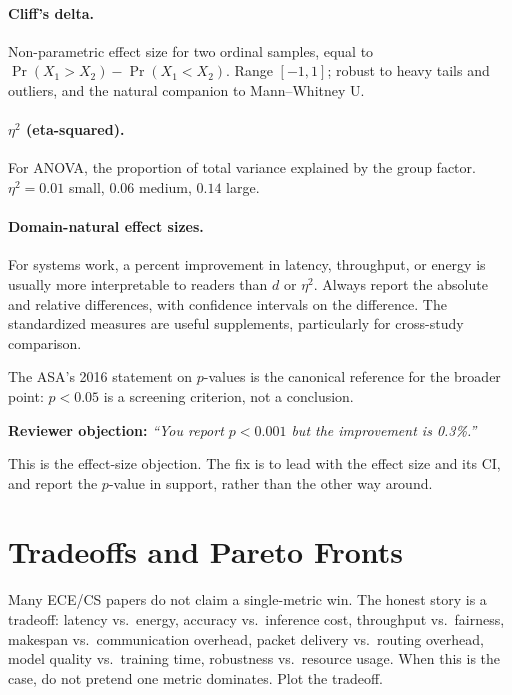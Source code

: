 \documentclass[11pt]{article}
\newenvironment{reviewerbox}[1]{%
    \begin{shaded*}\noindent\textbf{Reviewer objection: }\textit{#1}\par\smallskip
}{%
    \end{shaded*}%
}
\begin{document}
\paragraph{Cliff's delta.} Non-parametric effect size for two ordinal samples, equal to $\Pr(X_1 > X_2) - \Pr(X_1 < X_2)$. Range $[-1, 1]$; robust to heavy tails and outliers, and the natural companion to Mann--Whitney U.

\paragraph{$\eta^2$ (eta-squared).} For ANOVA, the proportion of total variance explained by the group factor. $\eta^2 = 0.01$ small, $0.06$ medium, $0.14$ large.

\paragraph{Domain-natural effect sizes.} For systems work, a percent improvement in latency, throughput, or energy is usually more interpretable to readers than $d$ or $\eta^2$. Always report the absolute and relative differences, with confidence intervals on the difference. The standardized measures are useful supplements, particularly for cross-study comparison.

The ASA's 2016 statement on $p$-values \citep{wasserstein2016asa} is the canonical reference for the broader point: $p < 0.05$ is a screening criterion, not a conclusion.

\begin{reviewerbox}{``You report $p < 0.001$ but the improvement is 0.3\%.''}
This is the effect-size objection. The fix is to lead with the effect size and its CI, and report the $p$-value in support, rather than the other way around.
\end{reviewerbox}

\section{Tradeoffs and Pareto Fronts}
\label{sec:tradeoffs}

Many ECE/CS papers do not claim a single-metric win. The honest story is a tradeoff: latency vs.\ energy, accuracy vs.\ inference cost, throughput vs.\ fairness, makespan vs.\ communication overhead, packet delivery vs.\ routing overhead, model quality vs.\ training time, robustness vs.\ resource usage. When this is the case, do not pretend one metric dominates. Plot the tradeoff.
\end{document}
